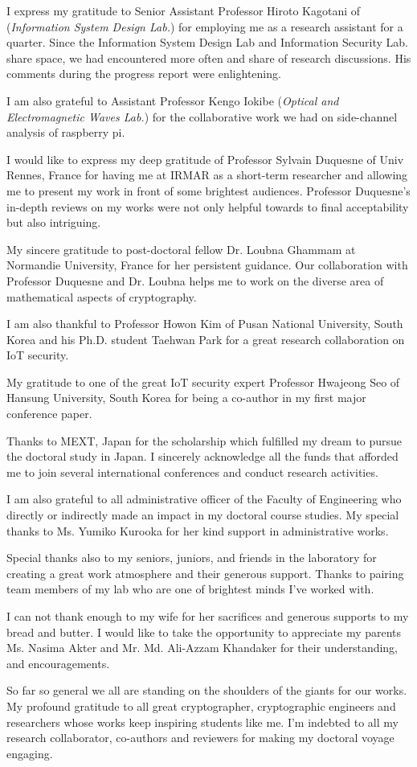  
I express my gratitude to Senior Assistant Professor Hiroto Kagotani of (\textit{Information System Design Lab.}) for employing me as a research assistant for a quarter. 
Since the Information System Design Lab and Information Security Lab. share space, we had encountered more often and share of research discussions.
His comments during the progress report were enlightening.

 
I am also grateful to Assistant Professor Kengo Iokibe (\textit{Optical and Electromagnetic Waves Lab.}) for the collaborative work we had on side-channel analysis of raspberry pi.

 
I would like to express my deep gratitude of Professor Sylvain Duquesne of  Univ  Rennes, France for having me at IRMAR as a short-term researcher and allowing me to present my work in front of some brightest audiences.
Professor Duquesne's in-depth reviews on my works were not only helpful towards to final acceptability but also intriguing.
   
My sincere gratitude to post-doctoral fellow Dr. Loubna Ghammam at Normandie University, France for her persistent guidance.
Our collaboration with  Professor Duquesne and Dr. Loubna helps me to work on the diverse area of mathematical aspects of cryptography.

 
I am also thankful to Professor Howon Kim of Pusan National University, South Korea and his Ph.D. student Taehwan Park for  a great research collaboration on IoT security.

My gratitude to one of the great IoT security expert Professor Hwajeong Seo of Hansung University, South Korea for being a co-author in my first major conference paper.

 
Thanks to MEXT, Japan  for the scholarship which fulfilled my dream to pursue the  doctoral study in Japan.
I sincerely acknowledge all the funds that afforded me to join several international conferences and conduct research activities.

 
I am also grateful to all  administrative officer of the Faculty of Engineering who directly or indirectly made an impact in my doctoral course studies. My special thanks to Ms. Yumiko Kurooka for her kind support in administrative works.

 
Special thanks also to my seniors, juniors, and friends in the  laboratory for creating a great work atmosphere and their generous support.  
Thanks to pairing team members of my lab who are one of brightest minds I've worked with.

I can not thank enough to my wife for her sacrifices and generous supports to my bread and butter. 
I would like to take the opportunity to appreciate my parents Ms. Nasima Akter and Mr. Md. Ali-Azzam Khandaker for their understanding, and encouragements.

 
So far so general we all are standing on the shoulders of the giants for our works. 
My profound gratitude to all great cryptographer, cryptographic engineers and researchers whose works keep inspiring students like me.
I'm indebted to all my research collaborator, co-authors and reviewers for making my doctoral voyage engaging.
